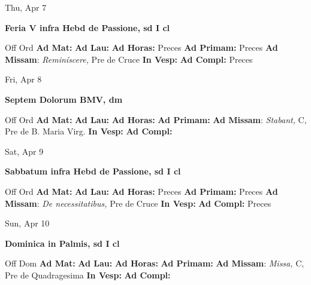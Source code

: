 \documentclass[10pt]{article}
\begin{document}
\begin{minipage}{3.5in}
\vspace{2em}\begin{center}
Thu, Apr 7
\end{center}\textbf{ \large Feria V infra Hebd de Passione, \textnormal{\normalsize sd I cl}}
\begin{justify}
Off Ord
\textbf{Ad Mat: }
\textbf{Ad Lau: }
\textbf{Ad Horas: }Preces
\textbf{Ad Primam: }Preces
\textbf{Ad Missam}: \textit{Reminíscere,} Pre de Cruce
\textbf{In Vesp: }
\textbf{Ad Compl: }Preces\end{justify}
\end{minipage}



\begin{minipage}{3.5in}
\vspace{2em}\begin{center}
Fri, Apr 8
\end{center}\textbf{ \large Septem Dolorum BMV, \textnormal{\normalsize dm}}
\begin{justify}
Off Ord
\textbf{Ad Mat: }
\textbf{Ad Lau: }
\textbf{Ad Horas: }
\textbf{Ad Primam: }
\textbf{Ad Missam}: \textit{Stabant,} C, Pre de B. Maria Virg.
\textbf{In Vesp: }
\textbf{Ad Compl: }\end{justify}
\end{minipage}



\begin{minipage}{3.5in}
\vspace{2em}\begin{center}
Sat, Apr 9
\end{center}\textbf{ \large Sabbatum infra Hebd de Passione, \textnormal{\normalsize sd I cl}}
\begin{justify}
Off Ord
\textbf{Ad Mat: }
\textbf{Ad Lau: }
\textbf{Ad Horas: }Preces
\textbf{Ad Primam: }Preces
\textbf{Ad Missam}: \textit{De necessitatibus,} Pre de Cruce
\textbf{In Vesp: }
\textbf{Ad Compl: }Preces\end{justify}
\end{minipage}



\begin{minipage}{3.5in}
\vspace{2em}\begin{center}
Sun, Apr 10
\end{center}\textbf{ \large Dominica in Palmis, \textnormal{\normalsize sd I cl}}
\begin{justify}
Off Dom
\textbf{Ad Mat: }
\textbf{Ad Lau: }
\textbf{Ad Horas: }
\textbf{Ad Primam: }
\textbf{Ad Missam}: \textit{Missa,} C, Pre de Quadragesima
\textbf{In Vesp: }
\textbf{Ad Compl: }\end{justify}
\end{minipage}
\end{document}
